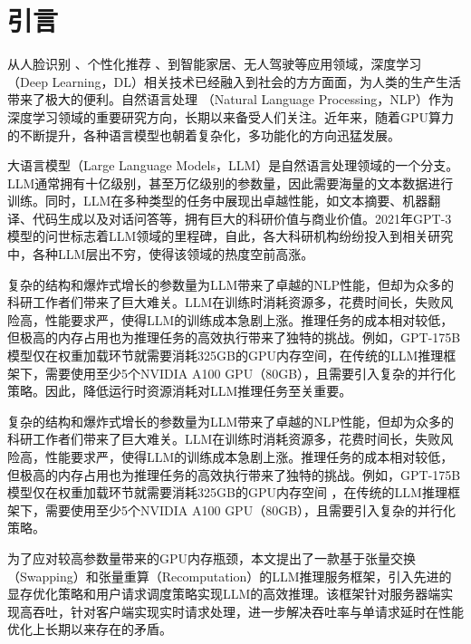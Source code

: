 \section{引言}

从人脸识别 \cite{Face-Recognition}、个性化推荐 \cite{Personal-Recommendation}、到智能家居\cite{Smart-Home}、无人驾驶\cite{Self-Driving-Car}等应用领域，深度学习 \cite{Deep-Learning}（Deep Learning，DL）相关技术已经融入到社会的方方面面，为人类的生产生活带来了极大的便利。自然语言处理 \cite{NLP}（Natural Language Processing，NLP）作为深度学习领域的重要研究方向，长期以来备受人们关注。近年来，随着GPU算力的不断提升，各种语言模型也朝着复杂化，多功能化的方向迅猛发展。 
\par
大语言模型\cite{LLM}（Large Language Models，LLM）是自然语言处理领域的一个分支。LLM通常拥有十亿级别，甚至万亿级别的参数量，因此需要海量的文本数据进行训练。同时，LLM在多种类型的任务中展现出卓越性能，如文本摘要\cite{Text-Summarization}、机器翻译\cite{Machine-Translation}、代码生成\cite{Code-Generation}以及对话问答\cite{Question-Answer}等，拥有巨大的科研价值与商业价值。2021年GPT-3模型\cite{Text-Summarization, GPT3}的问世标志着LLM领域的里程碑，自此，各大科研机构纷纷投入到相关研究中，各种LLM层出不穷，使得该领域的热度空前高涨。 
\par
复杂的结构和爆炸式增长的参数量为LLM带来了卓越的NLP性能，但却为众多的科研工作者们带来了巨大难关。LLM在训练时消耗资源多，花费时间长，失败风险高，性能要求严，使得LLM的训练成本急剧上涨。推理任务的成本相对较低，但极高的内存占用也为推理任务的高效执行带来了独特的挑战。例如，GPT-175B模型仅在权重加载环节就需要消耗325GB的GPU内存空间\cite{GPT-175B资源消耗}，在传统的LLM推理框架下，需要使用至少5个NVIDIA A100 GPU（80GB），且需要引入复杂的并行化策略。因此，降低运行时资源消耗对LLM推理任务至关重要。
\par
复杂的结构和爆炸式增长的参数量为LLM带来了卓越的NLP性能，但却为众多的科研工作者们带来了巨大难关。LLM在训练时消耗资源多，花费时间长，失败风险高，性能要求严，使得LLM的训练成本急剧上涨。推理任务的成本相对较低，但极高的内存占用也为推理任务的高效执行带来了独特的挑战。例如，GPT-175B模型仅在权重加载环节就需要消耗325GB的GPU内存空间 ，在传统的LLM推理框架下，需要使用至少5个NVIDIA A100 GPU（80GB），且需要引入复杂的并行化策略。
\par
为了应对较高参数量带来的GPU内存瓶颈，本文提出了一款基于张量交换\cite{Swapping}（Swapping）和张量重算\cite{Recomputation}（Recomputation）的LLM推理服务框架，引入先进的显存优化策略和用户请求调度策略实现LLM的高效推理。该框架针对服务器端实现高吞吐，针对客户端实现实时请求处理，进一步解决吞吐率与单请求延时在性能优化上长期以来存在的矛盾。 
